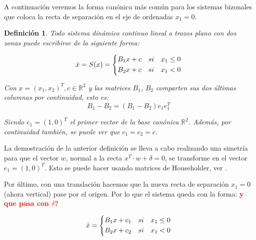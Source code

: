 \documentclass[12pt,a4paper]{report} %
\newtheorem{definicion}{Definición}[chapter]
\newtheorem{definicion}{Definición}[chapter] %
\begin{document}
	 \noindent A continuación veremos la forma canónica más común para los sistemas bizonales que coloca la recta de separación en el eje de ordenadas $x_1=0$.
	
	\begin{definicion}
		Todo sistema dinámico continuo lineal a trozos plano con dos zonas puede escribirse de la siguiente forma:
	
	\begin{equation}
		\dot{x}=S(x)=
		\label{eq:lien}
		\scalebox{1}{$\displaystyle
			\left\{
			\begin{aligned}
				B_1x+c\quad si \quad x_1 \leq 0 \\
				B_2x+c\quad si \quad x_1 < 0
			\end{aligned}
			\right.
			$}
	\end{equation}\smallskip
	
	\noindent Con $x=(x_1,x_2)^T, c\in \mathbb{R}^2$ y las matrices $B_1$, $B_2$ comparten sus dos últimas columnas por continuidad, esto es:
	\begin{equation}
		B_1-B_2 = \left(B_1-B_2\right)e_1e_1^T 
	\end{equation}\smallskip
	
	\noindent Siendo $e_1=(1,0)^T$ el primer vector de la base canónica $\mathbb{R}^2$. Además, por continuidad también, se puede ver que $c_1=c_2=c$.
    \end{definicion}\smallskip

\newpage

	\noindent La demostración de la anterior definición se lleva a cabo realizando una simetría para que el vector $w$, normal a la recta $x^T\cdotp w+\delta=0$, se transforme en el vector $e_1=(1,0)^T$. Esto se puede hacer usando matrices de Householder, ver \cite{docvic}.
	
	\vspace{0.5cm}\noindent Por último, con una translación hacemos que la nueva recta de separación $x_1=0$ (ahora vertical) pase por el origen. Por lo que el sistema queda con la forma:
	\textbf{\textcolor{red}{y que pasa con $\delta$?}}
	
	\begin{equation}
		\dot{x}=
		\label{eq:lien2}
		\scalebox{1}{$\displaystyle
			\left\{
			\begin{aligned}
			B_1x+c_1\quad si \quad x_1 \leq 0 \\
			B_2x+c_2\quad si \quad x_1 < 0
			\end{aligned}
			\right.
			$}
	\end{equation}\smallskip
	
\end{document}
